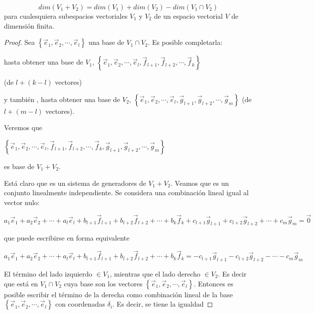 \begin{theorem}
\label{2131}
$$dim(V_1 +V_2) =dim(V_1)+dim(V_2)- dim(V_1 \cap V_2) $$
para cualesquiera subespacios vectoriales $V_1$ y $V_2$ de un espacio vectorial $V$ de dimensión finita.

\begin{proof}


\noindent
Sea  $ \left\{\vec{e}_1,\vec{e}_2,\cdots, \vec{e}_l  \right\}$ una base de $V_1 \cap V_2$. Es posible completarla:


\bigskip

\noindent
 hasta obtener una base de $V_1$, $ \left\{\vec{e}_1,\vec{e}_2,\cdots, \vec{e}_l , \vec{f}_{l+1},\vec{f}_{l+2},\cdots, \vec{f}_k  \right\} $ 
 
 (de $l+(k-l)$ vectores)


\bigskip

\noindent
y también ,  hasta obtener una base de  $V_2$, 
$ \left\{\vec{e}_1,\vec{e}_2,\cdots, \vec{e}_l,  \vec{g}_{l+1},\vec{g}_{l+2},\cdots, \vec{g}_m  \right\}$   (de $l+(m-l)$ vectores).

\bigskip

Veremos que 

\bigskip
$ \left\{\vec{e}_1,\vec{e}_2,\cdots, \vec{e}_l ,\vec{f}_{l+1},\vec{f}_{l+2},\cdots, \vec{f}_k , \vec{g}_{l+1},\vec{g}_{l+2},\cdots, \vec{g}_m  \right\}$ 

es base de $V_1 +V_2$.


\bigskip

Está claro que es un sistema de generadores  de $V_1 +V_2$. Veamos que es un conjunto linealmente independiente. Se considera una combinación lineal igual al vector nulo:

\bigskip
\noindent
$a_1\vec{e}_1+a_2\vec{e}_2+\cdots+ a_l \vec{e}_l + b_{l+1} \vec{f}_{l+1}+ b_{l+2}\vec{f}_{l+2}+\cdots+ b_k \vec{f}_k +  c_{l+1}\vec{g}_{l+1}+c_{l+2}\vec{g}_{l+2}+\cdots+ c_m \vec{g}_m =  \vec{0} $

\bigskip
\noindent
que puede escribirse en forma equivalente 

\bigskip

\noindent
$a_1\vec{e}_1+a_2\vec{e}_2+\cdots+ a_l \vec{e}_l + b_{l+1} \vec{f}_{l+1}+ b_{l+2}\vec{f}_{l+2}+\cdots+ b_k \vec{f}_k =  -c_{l+1}\vec{g}_{l+1}-c_{l+2}\vec{g}_{l+2}-\cdots- c_m \vec{g}_m $

\bigskip


El término del lado izquierdo $\in V_1$, mientras que el lado derecho $\in V_2$. Es decir que está en $V_1 \cap V_2$ cuya base son los vectores $ \left\{\vec{e}_1,\vec{e}_2,\cdots, \vec{e}_l  \right\}$. Entonces es posible escribir el término de la derecha como combinación lineal de la base $ \left\{\vec{e}_1,\vec{e}_2,\cdots, \vec{e}_l  \right\}$ con coordenadas $\delta_i$.  Es decir, se tiene la igualdad 


\end{proof}
\end{theorem}
